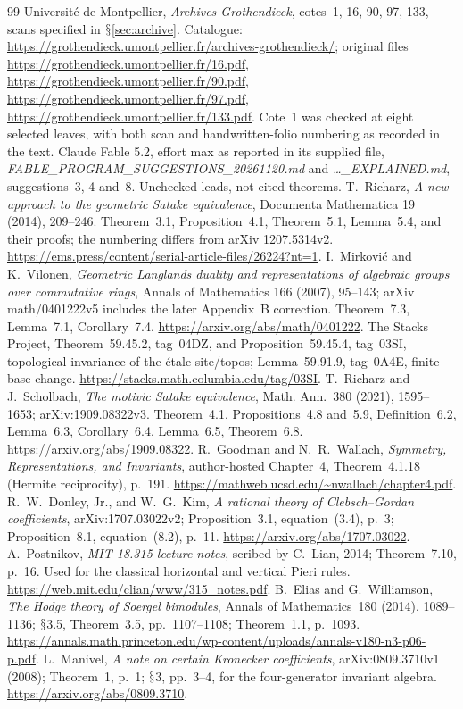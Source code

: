 \documentclass[11pt,a4paper]{article}
\renewcommand{\S}{\ensuremath{\mathsection}}
\theoremstyle{named}\newtheorem{finding}{Finding}[section]
\theoremstyle{definition}\newtheorem{definition}[finding]{Definition}
\theoremstyle{remark}\newtheorem{remark}[finding]{Remark}
\begin{document}
\begin{thebibliography}{99}
 Universit\'e de Montpellier, \emph{Archives Grothendieck}, cotes~1, 16, 90, 97, 133, scans specified in \S\ref{sec:archive}. Catalogue: \url{https://grothendieck.umontpellier.fr/archives-grothendieck/}; original files \url{https://grothendieck.umontpellier.fr/16.pdf}, \url{https://grothendieck.umontpellier.fr/90.pdf}, \url{https://grothendieck.umontpellier.fr/97.pdf}, \url{https://grothendieck.umontpellier.fr/133.pdf}. Cote~1 was checked at eight selected leaves, with both scan and handwritten-folio numbering as recorded in the text.
 Claude Fable 5.2, effort max as reported in its supplied file, \emph{FABLE\_PROGRAM\_SUGGESTIONS\_20261120.md} and \emph{\ldots\_EXPLAINED.md}, suggestions~3, 4 and~8. Unchecked leads, not cited theorems.
 T.~Richarz, \emph{A new approach to the geometric Satake equivalence}, Documenta Mathematica 19 (2014), 209--246. Theorem~3.1, Proposition~4.1, Theorem~5.1, Lemma~5.4, and their proofs; the numbering differs from arXiv 1207.5314v2. \url{https://ems.press/content/serial-article-files/26224?nt=1}.
 I.~Mirkovi\'c and K.~Vilonen, \emph{Geometric Langlands duality and representations of algebraic groups over commutative rings}, Annals of Mathematics 166 (2007), 95--143; arXiv math/0401222v5 includes the later Appendix~B correction. Theorem~7.3, Lemma~7.1, Corollary~7.4. \url{https://arxiv.org/abs/math/0401222}.
 The Stacks Project, Theorem~59.45.2, tag~04DZ, and Proposition~59.45.4, tag~03SI, topological invariance of the \'etale site/topos; Lemma~59.91.9, tag~0A4E, finite base change. \url{https://stacks.math.columbia.edu/tag/03SI}.
 T.~Richarz and J.~Scholbach, \emph{The motivic Satake equivalence}, Math. Ann.~380 (2021), 1595--1653; arXiv:1909.08322v3. Theorem~4.1, Propositions~4.8 and~5.9, Definition~6.2, Lemma~6.3, Corollary~6.4, Lemma~6.5, Theorem~6.8. \url{https://arxiv.org/abs/1909.08322}.
 R.~Goodman and N.~R.~Wallach, \emph{Symmetry, Representations, and Invariants}, author-hosted Chapter~4, Theorem~4.1.18 (Hermite reciprocity), p.~191. \url{https://mathweb.ucsd.edu/~nwallach/chapter4.pdf}.
 R.~W.~Donley, Jr., and W.~G.~Kim, \emph{A rational theory of Clebsch--Gordan coefficients}, arXiv:1707.03022v2; Proposition~3.1, equation~(3.4), p.~3; Proposition~8.1, equation~(8.2), p.~11. \url{https://arxiv.org/abs/1707.03022}.
 A.~Postnikov, \emph{MIT 18.315 lecture notes}, scribed by C.~Lian, 2014; Theorem~7.10, p.~16. Used for the classical horizontal and vertical Pieri rules. \url{https://web.mit.edu/clian/www/315_notes.pdf}.
 B.~Elias and G.~Williamson, \emph{The Hodge theory of Soergel bimodules}, Annals of Mathematics~180 (2014), 1089--1136; \S3.5, Theorem~3.5, pp.~1107--1108; Theorem~1.1, p.~1093. \url{https://annals.math.princeton.edu/wp-content/uploads/annals-v180-n3-p06-p.pdf}.
 L.~Manivel, \emph{A note on certain Kronecker coefficients}, arXiv:0809.3710v1 (2008); Theorem~1, p.~1; \S3, pp.~3--4, for the four-generator invariant algebra. \url{https://arxiv.org/abs/0809.3710}.


\end{thebibliography}
\end{document}
